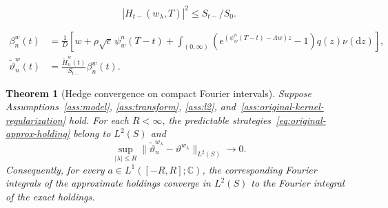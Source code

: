 \documentclass[10pt,a4paper]{amsart}
\newtheorem{theorem}{Theorem}
\newcommand{\C}{\mathbb{C}}
\newcommand{\dd}{\mathrm{d}}
\begin{document}
\begin{equation}
\label{eq:original-transform-envelope}
 |H_{t-}(w_\lambda,T)|^2\leq S_{t-}/S_0.
\end{equation}

\begin{align}
 \beta_n^w(t)&=\frac{1}{D}\left[
 w+\rho\sqrt c\,\psi_w^n(T-t)
 +\int_{(0,\infty)}\left(e^{(\psi_w^n(T-t)-\Lambda w)z}-1\right)q(z)\nu(\dd z)
 \right],\label{eq:original-approx-beta}\\
 \widetilde\vartheta_n^w(t)&=
 \frac{\widetilde H_n^w(t)}{S_{t-}}\beta_n^w(t).
 \label{eq:original-approx-holding}
\end{align}

\begin{theorem}[Hedge convergence on compact Fourier intervals]
\label{thm:original-compact-hedge}
Suppose Assumptions~\ref{ass:model}, \ref{ass:transform}, \ref{ass:l2},
and~\ref{ass:original-kernel-regularization} hold. For each $R<\infty$,
the predictable strategies~\eqref{eq:original-approx-holding} belong to
$L^2(S)$ and
\begin{equation}
\label{eq:original-compact-convergence}
 \sup_{|\lambda|\leq R}
 \|\widetilde\vartheta_n^{w_\lambda}
       -\vartheta^{w_\lambda}\|_{L^2(S)}\longrightarrow0.
\end{equation}
Consequently, for every $a\in L^1([-R,R];\C)$, the corresponding Fourier
integrals of the approximate holdings converge in $L^2(S)$ to the
Fourier integral of the exact holdings.
\end{theorem}
\end{document}

